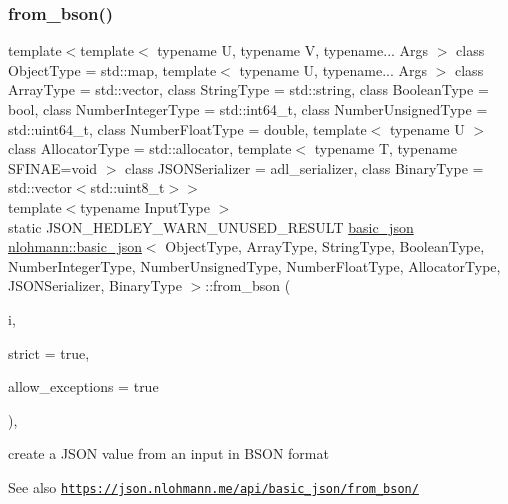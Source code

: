 \subsubsection{\texorpdfstring{from\+\_\+bson()}{from\_bson()}\hspace{0.1cm}{\footnotesize\ttfamily [1/2]}}
{\footnotesize\ttfamily template$<$template$<$ typename U, typename V, typename... Args $>$ class Object\+Type = std\+::map, template$<$ typename U, typename... Args $>$ class Array\+Type = std\+::vector, class String\+Type  = std\+::string, class Boolean\+Type  = bool, class Number\+Integer\+Type  = std\+::int64\+\_\+t, class Number\+Unsigned\+Type  = std\+::uint64\+\_\+t, class Number\+Float\+Type  = double, template$<$ typename U $>$ class Allocator\+Type = std\+::allocator, template$<$ typename T, typename S\+F\+I\+N\+A\+E=void $>$ class J\+S\+O\+N\+Serializer = adl\+\_\+serializer, class Binary\+Type  = std\+::vector$<$std\+::uint8\+\_\+t$>$$>$ \\
template$<$typename Input\+Type $>$ \\
static J\+S\+O\+N\+\_\+\+H\+E\+D\+L\+E\+Y\+\_\+\+W\+A\+R\+N\+\_\+\+U\+N\+U\+S\+E\+D\+\_\+\+R\+E\+S\+U\+LT \hyperlink{classnlohmann_1_1basic__json}{basic\+\_\+json} \hyperlink{classnlohmann_1_1basic__json}{nlohmann\+::basic\+\_\+json}$<$ Object\+Type, Array\+Type, String\+Type, Boolean\+Type, Number\+Integer\+Type, Number\+Unsigned\+Type, Number\+Float\+Type, Allocator\+Type, J\+S\+O\+N\+Serializer, Binary\+Type $>$\+::from\+\_\+bson (\begin{DoxyParamCaption}\item[{Input\+Type \&\&}]{i,  }\item[{const bool}]{strict = {\ttfamily true},  }\item[{const bool}]{allow\+\_\+exceptions = {\ttfamily true} }\end{DoxyParamCaption})\hspace{0.3cm}{\ttfamily [inline]}, {\ttfamily [static]}}



create a J\+S\+ON value from an input in B\+S\+ON format 

\begin{DoxySeeAlso}{See also}
\href{https://json.nlohmann.me/api/basic_json/from_bson/}{\tt https\+://json.\+nlohmann.\+me/api/basic\+\_\+json/from\+\_\+bson/} 
\end{DoxySeeAlso}
\mbox{\label{classnlohmann_1_1basic__json_a4118d0ec23d9eeafc236b9524d220e94}} 
